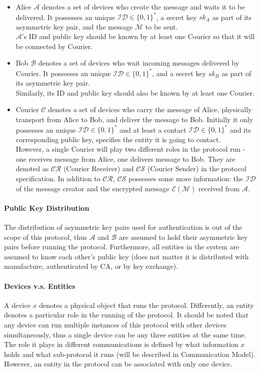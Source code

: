\begin{itemize}
\item Alice $\mathcal{A}$ denotes a set of devices who create the message and waits it to be delivered. It possesses an unique $\mathcal{ID} \in \{0, 1\}^*$, a secret key $sk_A$ as part of its asymmetric key pair, and the message $\mathcal{M}$ to be sent. \\
$\mathcal{A}$'s ID and public key should be known by at least one Courier so that it will be connected by Courier.

\item Bob $\mathcal{B}$ denotes a set of devices who wait incoming messages delivered by Courier. It possesses an unique $\mathcal{ID} \in \{0, 1\}^*$, and a secret key $sk_B$ as part of its asymmetric key pair.\\
Similarly, its ID and public key should also be known by at least one Courier.

\item Courier $\mathcal{C}$ denotes a set of devices who carry the message of Alice, physically transport from Alice to Bob, and deliver the message to Bob. Initially it only possesses an unique $\mathcal{ID} \in \{0, 1\}^*$ and at least a contact $\mathcal{ID} \in \{0, 1\}^*$ and its corresponding public key, specifies the entity it is going to contact.\\
However, a single Courier will play two different roles in the protocol run - one receives message from Alice, one delivers message to Bob. They are denoted as $\mathcal{CR}$ (Courier Receiver) and $\mathcal{CS}$ (Courier Sender) in the protocol specification. In addition to $\mathcal{CR}$, $\mathcal{CS}$ possesses some more information: the $\mathcal{ID}$ of the message creator and the encrypted message $\mathcal{E(M)}$ received from $\mathcal{A}$.
\end{itemize}

\paragraph{Public Key Distribution}
The distribution of asymmetric key pairs used for authentication is out of the scope of this protocol, thus $\mathcal{A}$ and $\mathcal{B}$ are assumed to hold their asymmetric key pairs before running the protocol. Furthermore, all entities in the system are assumed to know each other's public key (does not matter it is distributed with manufacture, authenticated by CA, or by key exchange).

\paragraph{Devices v.s. Entities}
A device $x$ denotes a physical object that runs the protocol. Differently, an entity denotes a particular role in the running of the protocol. It should be noted that any  device can run multiple instances of this protocol with other devices simultaneously, thus a single device can be any three entities at the same time. The role it plays in different communications is defined by what information $x$ holds and what sub-protocol it runs (will be described in Communication Model). However, an entity in the protocol can be associated with only one device.

